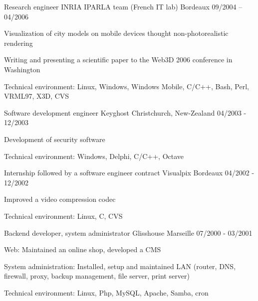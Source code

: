 \begin{cventries}
  \cventry
    {Research engineer}
    {INRIA IPARLA team (French IT lab)}
    {Bordeaux}
    {09/2004 – 04/2006}
    {
      \begin{cvitems}
        \item {Visualization of city models on mobile devices thought
            non-photorealistic rendering}
        \item {Writing and presenting a scientific paper to the Web3D 2006
            conference in Washington}
        \item {Technical environment: Linux, Windows, Windows Mobile, C/C++,
            Bash, Perl, VRML97, X3D, CVS}
      \end{cvitems}
    }

  \cventry
    {Software development engineer}
    {Keyghost}
    {Christchurch, New-Zealand}
    {04/2003 - 12/2003}
    {
      \begin{cvitems}
        \item {Development of security software}
		\item {Technical environment: Windows, Delphi, C/C++, Octave}
      \end{cvitems}
    }

  \cventry
    {Internship followed by a software engineer contract}
    {Visualpix}
    {Bordeaux}
    {04/2002 - 12/2002}
    {
      \begin{cvitems}
        \item {Improved a video compression codec}
		\item {Technical environment: Linux, C, CVS}
      \end{cvitems}
    }

  \cventry
    {Backend developer, system administrator}
    {Glisshouse}
    {Marseille}
    {07/2000 - 03/2001}
    {
      \begin{cvitems}
        \item {Web: Maintained an online shop, developed a CMS}
        \item {System administration: Installed, setup and maintained LAN
            (router, DNS, firewall, proxy, backup management, file server,
            print server)}
		\item {Technical environment: Linux, Php, MySQL, Apache, Samba, cron}
      \end{cvitems}
    }

\end{cventries}
